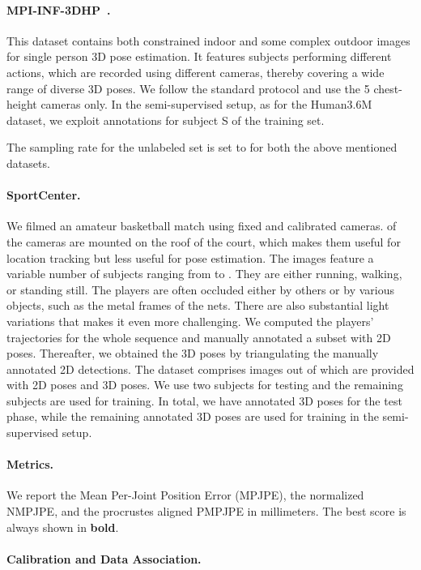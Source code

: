 \documentclass[runningheads]{llncs}
\begin{document}
\paragraph{MPI-INF-3DHP~\cite{Mehta17a}. }

This dataset contains both constrained indoor and some complex outdoor images for single person 3D pose estimation. It features  subjects performing  different actions, which are recorded using  different cameras, thereby covering a wide range of diverse 3D poses. We follow the standard protocol and use the 5 chest-height cameras only. In the semi-supervised setup, as for the Human3.6M dataset, we exploit annotations  for subject  S of the training set.

The sampling rate for the unlabeled set is set to  for both the above mentioned datasets.

\paragraph{SportCenter.} We filmed an amateur basketball match using  fixed and calibrated cameras.  of the  cameras are mounted on the roof of the court, which makes them useful for location tracking but less useful for pose estimation.  The images feature a variable number of subjects ranging from  to . They are either running, walking, or standing still. The players are often occluded either by others or by various objects, such as the metal frames of the nets. There are also substantial light variations that makes it even more challenging. We computed the players' trajectories for the whole sequence and manually annotated a subset with 2D poses. Thereafter, we obtained the 3D poses by triangulating the manually annotated 2D detections. The dataset comprises  images out of which  are provided with  2D poses and  3D poses. We use two subjects for testing and the remaining subjects are used for training. In total, we have  annotated 3D poses for the test phase, while the remaining  annotated 3D poses are used for training in the semi-supervised setup. 

\paragraph{Metrics.} 

We report the Mean Per-Joint Position Error (MPJPE), the normalized NMPJPE, and the procrustes aligned PMPJPE in millimeters. The best score is always shown in \textbf{bold}.

\paragraph{Calibration and Data Association.}
\end{document}
